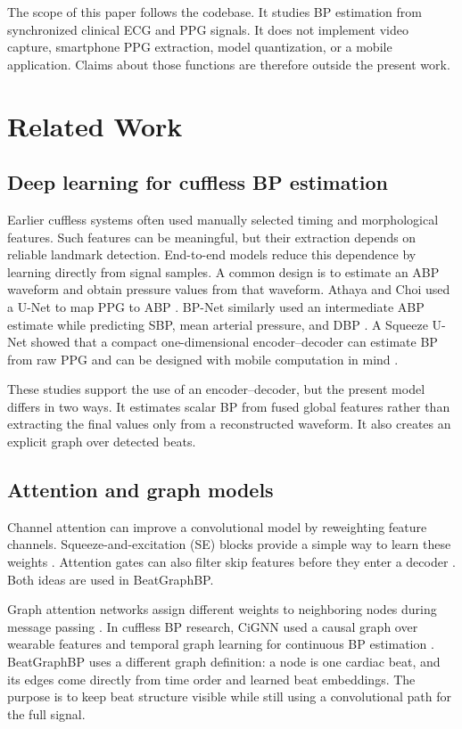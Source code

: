 \documentclass[journal,twoside,web]{ieeecolor}
\begin{document}
The scope of this paper follows the codebase. It studies BP estimation from synchronized clinical ECG and PPG signals. It does not implement video capture, smartphone PPG extraction, model quantization, or a mobile application. Claims about those functions are therefore outside the present work.

\section{Related Work}\label{sec:related}

\subsection{Deep learning for cuffless BP estimation}

Earlier cuffless systems often used manually selected timing and morphological features. Such features can be meaningful, but their extraction depends on reliable landmark detection. End-to-end models reduce this dependence by learning directly from signal samples. A common design is to estimate an ABP waveform and obtain pressure values from that waveform. Athaya and Choi used a U-Net to map PPG to ABP \cite{athaya2021unet}. BP-Net similarly used an intermediate ABP estimate while predicting SBP, mean arterial pressure, and DBP \cite{esmaelpoor2022bpnet}. A Squeeze U-Net showed that a compact one-dimensional encoder--decoder can estimate BP from raw PPG and can be designed with mobile computation in mind \cite{mou2022squeeze}.

These studies support the use of an encoder--decoder, but the present model differs in two ways. It estimates scalar BP from fused global features rather than extracting the final values only from a reconstructed waveform. It also creates an explicit graph over detected beats.

\subsection{Attention and graph models}

Channel attention can improve a convolutional model by reweighting feature channels. Squeeze-and-excitation (SE) blocks provide a simple way to learn these weights \cite{hu2018senet}. Attention gates can also filter skip features before they enter a decoder \cite{oktay2018attention}. Both ideas are used in BeatGraphBP.

Graph attention networks assign different weights to neighboring nodes during message passing \cite{velickovic2018gat}. In cuffless BP research, CiGNN used a causal graph over wearable features and temporal graph learning for continuous BP estimation \cite{jin2024cignn}. BeatGraphBP uses a different graph definition: a node is one cardiac beat, and its edges come directly from time order and learned beat embeddings. The purpose is to keep beat structure visible while still using a convolutional path for the full signal.
\end{document}

